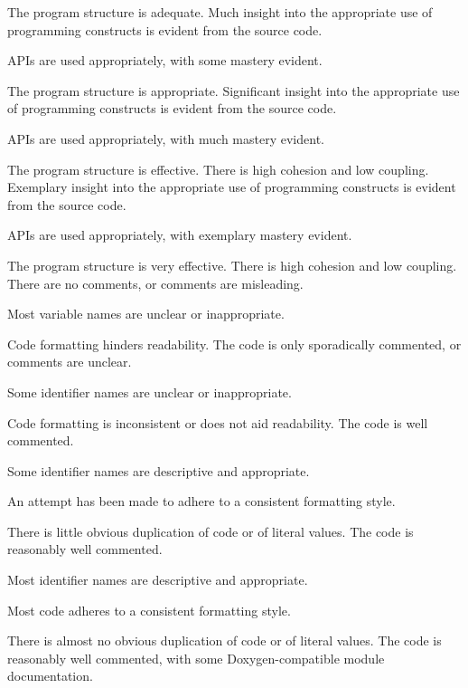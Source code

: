 \documentclass{../fal_assignment}
\begin{document}
\begin{markingrubric}
            \par The program structure is adequate.
        \grade Much insight into the appropriate use of programming constructs is evident from the source code.
            \par APIs are used appropriately, with some mastery evident.
            \par The program structure is appropriate.
        \grade Significant insight into the appropriate use of programming constructs is evident from the source code.
            \par APIs are used appropriately, with much mastery evident.
            \par The program structure is effective. There is high cohesion and low coupling.
        \grade Exemplary insight into the appropriate use of programming constructs is evident from the source code.
            \par APIs are used appropriately, with exemplary mastery evident.
            \par The program structure is very effective. There is high cohesion and low coupling.
%
        \grade\fail There are no comments, or comments are misleading.
            \par Most variable names are unclear or inappropriate.
            \par Code formatting hinders readability.
        \grade The code is only sporadically commented, or comments are unclear.
            \par Some identifier names are unclear or inappropriate.
            \par Code formatting is inconsistent or does not aid readability.
        \grade The code is well commented.
            \par Some identifier names are descriptive and appropriate.
            \par An attempt has been made to adhere to a consistent formatting style.
             \par There is little obvious duplication of code or of literal values.           
        \grade The code is reasonably well commented.
            \par Most identifier names are descriptive and appropriate.
            \par Most code adheres to a consistent formatting style.
             \par There is almost no obvious duplication of code or of literal values.   
        \grade The code is reasonably well commented, with some Doxygen-compatible module documentation.

\end{markingrubric}
\end{document}
